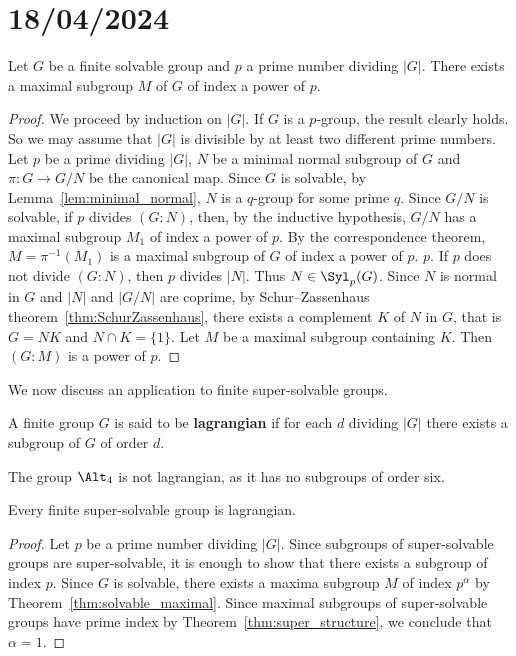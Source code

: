 \section{18/04/2024}

\begin{theorem}
	\label{thm:solvable_maximal}
	Let $G$ be a finite solvable group and $p$ a prime number dividing $|G|$. There exists a maximal 
    subgroup $M$ of $G$ of index a power of $p$. 
\end{theorem}

\begin{proof}
	We proceed by induction on $|G|$. If $G$ is a $p$-group, the result clearly holds. So we may assume that $|G|$ is divisible by at least two different prime numbers. 
    Let $p$ be a prime dividing $|G|$, $N$ be a minimal normal subgroup of $G$ and 
    $\pi\colon G\to G/N$ be the canonical map. Since $G$ is solvable, by Lemma~\ref{lem:minimal_normal}, 
    $N$ is a $q$-group for some prime $q$. Since $G/N$ is solvable, if $p$ divides 
	$(G:N)$, then, by the inductive hypothesis, $G/N$ has a maximal subgroup 
 	$M_1$ of index a power of $p$. By the correspondence theorem, 
  $M=\pi^{-1}(M_1)$ is a maximal subgroup of $G$ of index a power of $p$. 
  $p$. If $p$ does not divide $(G:N)$, then $p$ divides $|N|$. Thus 
	$N\in\Syl_p(G)$. Since $N$ is normal in $G$ and $|N|$ and $|G/N|$ are coprime, by 
	Schur--Zassenhaus theorem~\ref{thm:SchurZassenhaus}, 
	there exists a complement $K$ of $N$ in $G$, that is $G=NK$ and $N\cap K=\{1\}$. Let 
	$M$ be a maximal subgroup containing $K$. Then $(G:M)$ is a power of $p$. 
\end{proof}

We now discuss an application to finite super-solvable groups. 

\begin{definition}
	A finite group $G$ is said to be \textbf{lagrangian} if for each $d$ dividing $|G|$ 
	there exists a subgroup of $G$ of order $d$.
\end{definition}

The group $\Alt_4$ is not lagrangian, as it has no subgroups of order six. 

\begin{theorem}
	Every finite super-solvable group is lagrangian. 
\end{theorem}

\begin{proof}
	Let $p$ be a prime number dividing $|G|$. Since subgroups of super-solvable groups are super-solvable, it is enough to 
    show that there exists a subgroup of index $p$. 
	Since $G$ is solvable, there exists a maxima subgroup $M$ of index 
	$p^{\alpha}$ by Theorem~\ref{thm:solvable_maximal}. Since maximal 
 subgroups of super-solvable groups have prime index 
    by Theorem~\ref{thm:super_structure}, we conclude that $\alpha=1$.
\end{proof}

